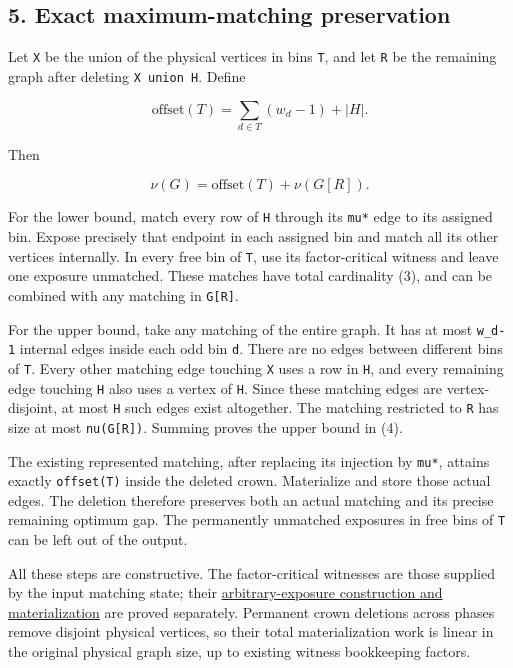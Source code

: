 \hypertarget{af-f687f276ee-exact-maximum-matching-preservation}{%
\subsection{5. Exact maximum-matching preservation}\label{af-f687f276ee-exact-maximum-matching-preservation}}

Let \texttt{X} be the union of the physical vertices in bins \texttt{T}, and let \texttt{R} be the remaining graph after deleting \texttt{X\ union\ H}. Define

\[
\mathrm{offset}(T)=\sum_{d\in T}(w_d-1)+|H|.\tag{3}
\]

Then

\[
\nu(G)=\mathrm{offset}(T)+\nu(G[R]).\tag{4}
\]

For the lower bound, match every row of \texttt{H} through its \texttt{mu*} edge to its assigned bin. Expose precisely that endpoint in each assigned bin and match all its other vertices internally. In every free bin of \texttt{T}, use its factor-critical witness and leave one exposure unmatched. These matches have total cardinality (3), and can be combined with any matching in \texttt{G{[}R{]}}.

For the upper bound, take any matching of the entire graph. It has at most \texttt{w\_d-1} internal edges inside each odd bin \texttt{d}. There are no edges between different bins of \texttt{T}. Every other matching edge touching \texttt{X} uses a row in \texttt{H}, and every remaining edge touching \texttt{H} also uses a vertex of \texttt{H}. Since these matching edges are vertex-disjoint, at most \texttt{\textbar{}H\textbar{}} such edges exist altogether. The matching restricted to \texttt{R} has size at most \texttt{nu(G{[}R{]})}. Summing proves the upper bound in (4).

The existing represented matching, after replacing its injection by \texttt{mu*}, attains exactly \texttt{offset(T)} inside the deleted crown. Materialize and store those actual edges. The deletion therefore preserves both an actual matching and its precise remaining optimum gap. The permanently unmatched exposures in free bins of \texttt{T} can be left out of the output.

All these steps are constructive. The factor-critical witnesses are those supplied by the input matching state; their \href{https://github.com/icekylinx/algorithm-frontier/blob/main/manuscripts/graph-backends/factor-critical-contractions.md}{arbitrary-exposure construction and materialization} are proved separately. Permanent crown deletions across phases remove disjoint physical vertices, so their total materialization work is linear in the original physical graph size, up to existing witness bookkeeping factors.

